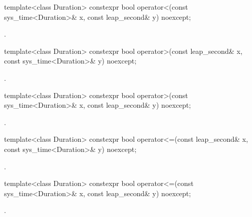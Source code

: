 %
%
\begin{itemdecl}
template<class Duration>
  constexpr bool operator<(const sys_time<Duration>& x, const leap_second& y) noexcept;
\end{itemdecl}

\begin{itemdescr}
\pnum
\returns
{}.
\end{itemdescr}

%
%
\begin{itemdecl}
template<class Duration>
  constexpr bool operator>(const leap_second& x, const sys_time<Duration>& y) noexcept;
\end{itemdecl}

\begin{itemdescr}
\pnum
\returns
{}.
\end{itemdescr}

%
%
\begin{itemdecl}
template<class Duration>
  constexpr bool operator>(const sys_time<Duration>& x, const leap_second& y) noexcept;
\end{itemdecl}

\begin{itemdescr}
\pnum
\returns
{}.
\end{itemdescr}

%
%
\begin{itemdecl}
template<class Duration>
  constexpr bool operator<=(const leap_second& x, const sys_time<Duration>& y) noexcept;
\end{itemdecl}

\begin{itemdescr}
\pnum
\returns
{}.
\end{itemdescr}

%
%
\begin{itemdecl}
template<class Duration>
  constexpr bool operator<=(const sys_time<Duration>& x, const leap_second& y) noexcept;
\end{itemdecl}

\begin{itemdescr}
\pnum
\returns
{}.
\end{itemdescr}

